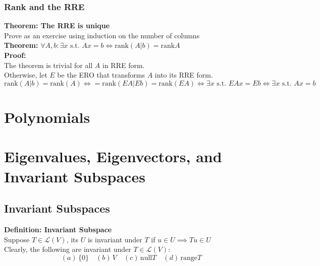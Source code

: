 \documentclass{article}
\newcommand{\st}{\mbox{ s.t. }}
\newcommand{\0}{{\bf{0}}}
\begin{document}
\subsubsection{Rank and the RRE}
\textbf{Theorem: The RRE is unique}\\
\null\hfill{Prove as an exercise using induction on the number of columns}\\
\textbf{Theorem: }$\forall A,b:\exists x\st Ax=b\iff\mbox{rank}(A|b)=\mbox{rank}A$\\
\textbf{Proof:}\\
The theorem is trivial for all $A$ in RRE form.\\
Otherwise, let $E$ be the ERO that transforms $A$ into its RRE form.
$$\mbox{rank}(A|b)=\mbox{rank}(A)\iff=\mbox{rank}(EA|Eb)=\mbox{rank}(EA)\iff\exists x\st EAx=Eb\iff\exists x\st Ax=b$$
\clearpage
\section{Polynomials}
\clearpage
\section{Eigenvalues, Eigenvectors, and Invariant Subspaces}
\subsection{Invariant Subspaces}
\textbf{Definition: Invariant Subspace}\\
Suppose $T\in\mathcal{L}(V)$, its $U$ is invariant under $T$ if $u\in U\implies Tu\in U$\\
Clearly, the following are invariant under $T\in\mathcal{L}(V)$:
$$(a)\,\{0\}\quad(b)\,V\quad(c)\,\mbox{null}T\quad(d)\,\mbox{range}T$$
\end{document}
